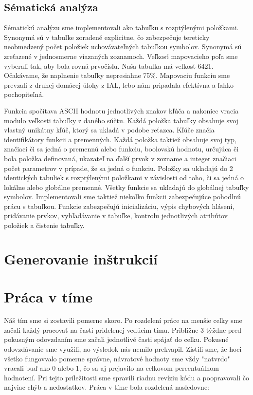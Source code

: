 \documentclass [11pt, a4paper]{article}
\begin{document}
\subsection{Sématická analýza}
Sématickú analýzu sme implementovali ako tabuľku s rozptýlenými položkami. Synonymá sú v tabuľke zoradené explicitne, čo zabezpečuje tereticky neobmedzený počet položiek uchovávateľných tabuľkou symbolov. Synonymá sú zreťazené v jednosmerne viazaných zoznamoch. Veľkosť mapovacieho poľa sme vyberali tak, aby bola rovná prvočíslu. Naša tabuľka má veľkosť 6421. Očakávame, že naplnenie tabuľky nepresiahne 75\%. Mapovaciu funkciu sme prevzali z druhej domácej úlohy z IAL, lebo nám pripadala efektívna a ľahko pochopiteľná. 

Funkcia spočítava ASCII hodnotu jednotlivých znakov kľúča a nakoniec vracia modulo veľkosti tabuľky z daného súčtu. Každá položka tabuľky obsahuje svoj vlastný unikátny kľúč, ktorý sa ukladá v podobe reťazca. Kľúče značia identifikátory funkcii a premenných. Každá položka taktiež obsahuje svoj typ, značiaci či sa jedná o premennú alebo funkciu, boolovskú hodnotu, určujúca či bola položka definovaná, ukazateľ na ďalší prvok v zozname a integer značiaci počet parametrov v prípade, že sa jedná o funkciu. Položky sa ukladajú do 2 identických tabuliek s rozptýlenými položkami v závislosti od toho, či sa jedná o lokálne alebo globálne premenné. Všetky funkcie sa ukladajú do globálnej tabuľky symbolov. Implementovali sme taktiež niekoľko funkcii zabezpečujúce pohodlnú prácu s tabuľkou. Funkcie zabezpečujú inicializáciu, výpis chybových hlásení, pridávanie prvkov, vyhľadávanie v tabuľke, kontrolu jednotlivých atribútov položiek a čistenie tabuľky.

\section{Generovanie inštrukcií}

\section{Práca v tíme}
Náš tím sme si zostavili pomerne skoro. Po rozdelení práce na menšie celky sme začali každý pracovať na časti pridelenej vedúcim tímu. Približne 3 týždne pred pokusným odovzdaním sme začali jednotlivé časti spájať do celku. Pokusné odovzdávanie sme využili, no výsledok nás nemilo prekvapil. Zistili sme, že hoci všetko fungovvalo pomerne správne, návratové hodnoty sme vždy "natvrdo" vracali buď ako 0 alebo 1, čo sa aj prejavilo na celkovom percentuálnom hodnotení. Pri tejto príležitosti sme spravili riadnu revíziu kódu a poopravovali čo najviac chýb a nedostatkov. Práca v tíme bola rozdelená nasledovne:
\end{document}
